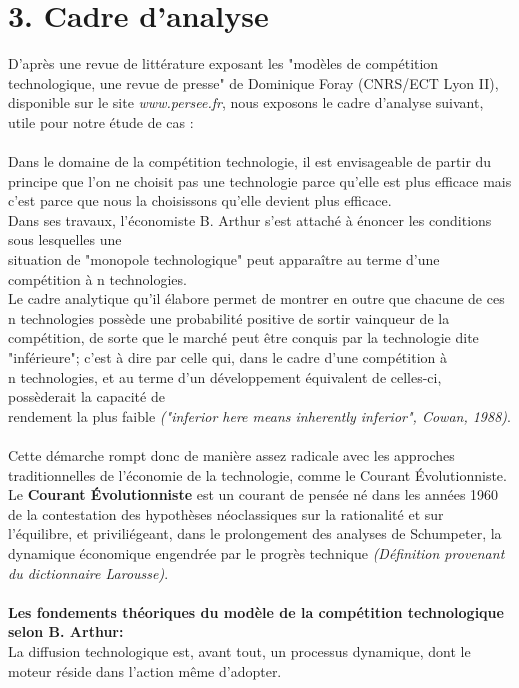 \documentclass[a4paper, 10pt]{article}
\begin{document}
\section*{3. Cadre d'analyse}
D'après une revue de littérature exposant les "modèles de compétition technologique, une revue de presse" de Dominique Foray (CNRS/ECT Lyon II),
disponible sur le site \textit{www.persee.fr}, nous exposons le cadre d'analyse suivant, utile pour notre étude de cas :\\ \\
Dans le domaine de la compétition technologie, il est envisageable de partir du principe que l'on ne choisit pas une technologie parce
qu'elle est plus efficace mais c'est parce que nous la choisissons qu'elle devient plus efficace.\\
Dans ses travaux, l'économiste B. Arthur s'est attaché à énoncer les conditions sous lesquelles une\\situation de "monopole technologique"
peut apparaître au terme d'une compétition à n technologies.\\
Le cadre analytique qu'il élabore permet de montrer en outre que chacune de ces n technologies possède
une probabilité positive de sortir vainqueur de la compétition, de sorte que le marché peut être conquis par la technologie dite "inférieure";
c'est à dire par celle qui, dans le cadre d'une compétition à\\n technologies, et au terme d'un développement équivalent de celles-ci,
possèderait la capacité de\\rendement la plus faible \textit{("inferior here means inherently inferior", Cowan, 1988)}.\\ \\
Cette démarche rompt donc de manière assez radicale avec les approches traditionnelles de l'économie de la technologie,
comme le Courant Évolutionniste.\\
Le \textbf{Courant Évolutionniste} est un courant de pensée né dans les années 1960 de la contestation des hypothèses néoclassiques
sur la rationalité et sur l'équilibre, et priviliégeant, dans le prolongement des analyses de Schumpeter,
la dynamique économique engendrée par le progrès technique \textit{(Définition provenant du dictionnaire Larousse)}.\\ \\
\textbf{Les fondements théoriques du modèle de la compétition technologique selon B. Arthur:}\\
La diffusion technologique est, avant tout, un processus dynamique, dont le moteur réside dans l'action même d'adopter.
\end{document}
